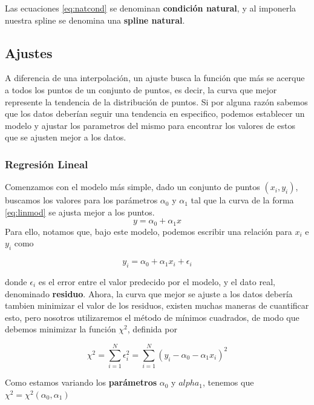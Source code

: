 Las ecuaciones \eqref{eq:natcond} se denominan \textbf{condición natural}, y al imponerla nuestra spline se denomina una \textbf{spline natural}.

\subsection{Ajustes}
A diferencia de una interpolación, un ajuste busca la función que más se acerque a todos los puntos de un conjunto de puntos, es decir, la curva que mejor represente la tendencia de la distribución de puntos. Si por alguna razón sabemos que los datos deberían seguir una tendencia en especifico, podemos establecer un modelo y ajustar los parametros del mismo para encontrar los valores de estos que se ajusten mejor a los datos.

\subsubsection{Regresión Lineal}%
Comenzamos con el modelo más simple, dado un conjunto de puntos $(x_{i}, y_{i})$, buscamos los valores para los parámetros $\alpha_{0}$ y $\alpha_{1}$ tal que la curva de la forma \eqref{eq:linmod} se ajusta mejor a los puntos.
\begin{equation} \label{eq:linmod}
  y = \alpha_{0} + \alpha_{1}x
 \end{equation}
Para ello, notamos que, bajo este modelo, podemos escribir una relación para $x_{i}$ e $y_{i}$ como

\begin{equation}
  y_{i} = \alpha_{0} + \alpha_{1}x_{i} + \epsilon_{i}
 \end{equation}

 donde $\epsilon_{i}$ es el error entre el valor predecido por el modelo, y el dato real, denominado \textbf{residuo}. Ahora, la curva que mejor se ajuste a los datos debería tambien minimizar el valor de los residuos, existen muchas maneras de cuantificar esto, pero nosotros utilizaremos el método de mínimos cuadrados, de modo que debemos minimizar la función $\chi^{2}$, definida por

 \begin{equation}
   \chi^{2} = \sum_{i=1}^{N} \epsilon_{i}^{2} = \sum_{i=1}^{N} (y_{i} -\alpha_{0} - \alpha_{1}x_{i} )^{2}
  \end{equation}

Como estamos variando los \textbf{parámetros} $\alpha_{0}$  y $alpha_{1}$, tenemos que $\chi^{2} = \chi^{2}(\alpha_{0}, \alpha_{1})$

